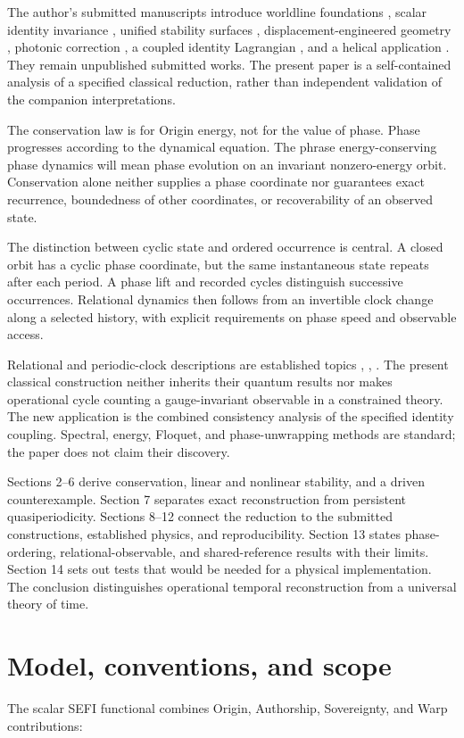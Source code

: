\documentclass[aip,adv,preprint,floatfix]{revtex4-2}
\begin{document}
The author's submitted manuscripts introduce worldline foundations \cite{r1}, scalar identity invariance \cite{r2}, unified stability surfaces \cite{r3}, displacement-engineered geometry \cite{r4}, photonic correction \cite{r5}, a coupled identity Lagrangian \cite{r6}, and a helical application \cite{r7}. They remain unpublished submitted works. The present paper is a self-contained analysis of a specified classical reduction, rather than independent validation of the companion interpretations.

The conservation law is for Origin energy, not for the value of phase. Phase progresses according to the dynamical equation. The phrase energy-conserving phase dynamics will mean phase evolution on an invariant nonzero-energy orbit. Conservation alone neither supplies a phase coordinate nor guarantees exact recurrence, boundedness of other coordinates, or recoverability of an observed state.

The distinction between cyclic state and ordered occurrence is central. A closed orbit has a cyclic phase coordinate, but the same instantaneous state repeats after each period. A phase lift and recorded cycles distinguish successive occurrences. Relational dynamics then follows from an invertible clock change along a selected history, with explicit requirements on phase speed and observable access.

Relational and periodic-clock descriptions are established topics \cite{r8}, \cite{r9}, \cite{r10}. The present classical construction neither inherits their quantum results nor makes operational cycle counting a gauge-invariant observable in a constrained theory. The new application is the combined consistency analysis of the specified identity coupling. Spectral, energy, Floquet, and phase-unwrapping methods are standard; the paper does not claim their discovery.

Sections 2–6 derive conservation, linear and nonlinear stability, and a driven counterexample. Section 7 separates exact reconstruction from persistent quasiperiodicity. Sections 8–12 connect the reduction to the submitted constructions, established physics, and reproducibility. Section 13 states phase-ordering, relational-observable, and shared-reference results with their limits. Section 14 sets out tests that would be needed for a physical implementation. The conclusion distinguishes operational temporal reconstruction from a universal theory of time.

\section{Model, conventions, and scope}
The scalar SEFI functional \cite{r2} combines Origin, Authorship, Sovereignty, and Warp contributions:
\end{document}
